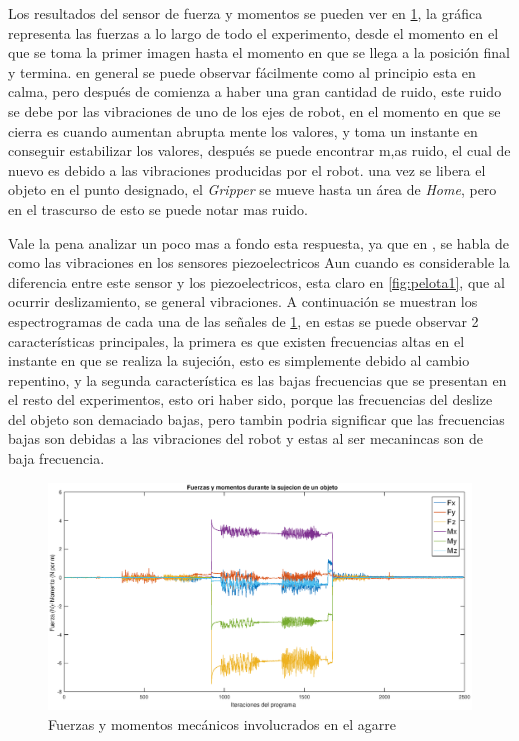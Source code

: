 \clearpage



Los resultados del sensor de fuerza y momentos se pueden ver en  \cref{fig:twist1}, la gráfica representa las fuerzas a lo largo de todo el experimento, desde el momento en el que se toma la primer imagen hasta el momento en que se llega a la posición final y termina. en general se puede observar fácilmente como al principio esta en calma, pero después de comienza a haber una gran cantidad de ruido, este ruido  se debe por las vibraciones de uno de los ejes de robot, en el momento en que se cierra es cuando aumentan abrupta mente los valores, y toma un instante en conseguir estabilizar los valores, después se puede encontrar m,as ruido, el cual de nuevo es debido a las vibraciones producidas por el robot.
una vez se libera el objeto en el punto designado, el \textit{Gripper} se mueve hasta un área de \textit{Home}, pero en el trascurso de esto se puede notar mas ruido.

Vale la pena analizar un poco mas a fondo esta respuesta, ya que en \cite[add. text]{keylist}, se habla de como las vibraciones en los sensores piezoelectricos 
Aun cuando es considerable la diferencia entre este sensor y los piezoelectricos, esta claro en \cref{fig:pelota1}, que al ocurrir deslizamiento, se general vibraciones.
A continuación se muestran los espectrogramas de cada una de las señales de \cref{fig:twist1}, en estas se puede observar 2 características principales, la primera es que existen frecuencias altas en el instante en que se realiza la sujeción, esto es simplemente debido al cambio repentino, y la segunda característica es las bajas frecuencias que se presentan en el resto del experimentos, esto ori haber sido, porque las frecuencias del deslize del objeto son demaciado bajas, pero tambin podria significar que las frecuencias bajas son debidas a las vibraciones del robot y estas al ser mecanincas son de baja frecuencia.










\begin{figure}
	\centering
	\includegraphics[width=1\linewidth]{visio/graficasderesultados/twist1}
	\caption{Fuerzas y momentos mecánicos involucrados en el agarre}
	\label{fig:twist1}
\end{figure}


